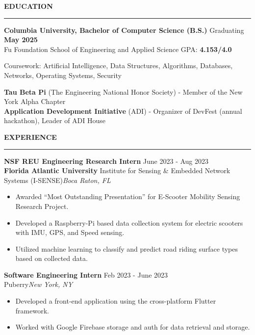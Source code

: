 \documentclass[11pt,letterpaper]{article}
\begin{document}
\medskip
\MakeUppercase{{\bf Education}}
\medskip
\hrule
\begin{list}{}{\setlength{\leftmargin}{0em}}
    \item
          {\bf Columbia University, Bachelor of Computer Science (B.S.)} \hfill  {Graduating {\bf May 2025}}\\
          Fu Foundation School of Engineering and Applied Science \hfill {GPA: {\bf 4.153/4.0}}
          
          Coursework: Artificial Intelligence, Data Structures, Algorithms, Databases, Networks, Operating Systems, Security

            {\bf Tau Beta Pi} (The Engineering National Honor Society) - Member of the New York Alpha Chapter \\
            {\bf Application Development Initiative} (ADI) - Organizer of DevFest (annual hackathon), Leader of ADI House
\end{list}


\medskip
\MakeUppercase{{\bf Experience}}
\medskip
\hrule
\begin{list}{}{\setlength{\leftmargin}{0em}}

    \item
          \textbf{NSF REU Engineering Research Intern} \hfill June 2023 - Aug 2023\\
          \textbf{Florida Atlantic University} Institute for Sensing \& Embedded Network Systems (I-SENSE)\hfill \textit{Boca Raton, FL}
          \begin{itemize}[noitemsep, topsep=0pt]
              \item Awarded ``Most Outstanding Presentation'' for E-Scooter Mobility Sensing Research Project.
              \item Developed a Raspberry-Pi based data collection system for electric scooters with IMU, GPS, and Speed sensing.
              \item Utilized machine learning to classify and predict road riding surface types based on collected data.
          \end{itemize}

    \item
          \textbf{Software Engineering Intern} \hfill Feb 2023 - June 2023\\
          Puberry\hfill \textit{New York, NY}
          \begin{itemize}[noitemsep, topsep=-5pt]
              \item Developed a front-end application using the cross-platform Flutter framework.
              \item Worked with Google Firebase storage and auth for data retrieval and storage.
          \end{itemize}
\end{list}
\end{document}
